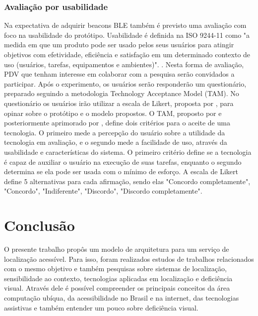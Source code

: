 \documentclass[english,brazilian]{UNISINOSmonografia}
\begin{document}
\subsection{Avaliação por usabilidade}
Na expectativa de adquirir beacons BLE também é previsto uma avaliação com foco na usabilidade do protótipo. Usabilidade é definida na ISO 9244-11 como "a medida em que um produto pode ser usado pelos seus usuários para atingir objetivos com efetividade, eficiência e satisfação em um determinado contexto de uso (usuários, tarefas, equipamentos e ambientes)". \cite{ISO9241}.
Nesta forma de avaliação, PDV que tenham interesse em colaborar com a pesquisa serão convidados a participar. Após o experimento, os usuários serão responderão um questionário, preparado seguindo a metodologia Technology Acceptance Model (TAM). No questionário os usuários irão utilizar a escala de Likert, proposta por , para opinar sobre o protótipo e o modelo propostos. O TAM, proposto por  e posteriormente aprimorado por , define dois critérios para o aceite de uma tecnologia. O primeiro mede a percepção do usuário sobre a utilidade da tecnologia em avaliação, e o segundo mede a facilidade de uso, através da usabilidade e características do sistema. O primeiro critério define se a tecnologia é capaz de auxiliar o usuário na execução de suas tarefas, enquanto o segundo determina se ela pode ser usada com o mínimo de esforço. A escala de Likert define 5 alternativas para cada afirmação, sendo elas "Concordo completamente", "Concordo", "Indiferente", "Discordo", "Discordo completamente".

\chapter{Conclusão}

O presente trabalho propôs um modelo de arquitetura para um serviço de localização acessível. Para isso, foram realizados estudos de trabalhos relacionados com o mesmo objetivo e também pesquisas sobre sistemas de localização, sensibilidade ao contexto, tecnologias aplicadas em localização e deficiência visual. Através dele é possível compreender os principais conceitos da área computação ubíqua, da acessibilidade no Brasil e na internet, das tecnologias assistivas e também entender um pouco sobre deficiência visual.
\end{document}
